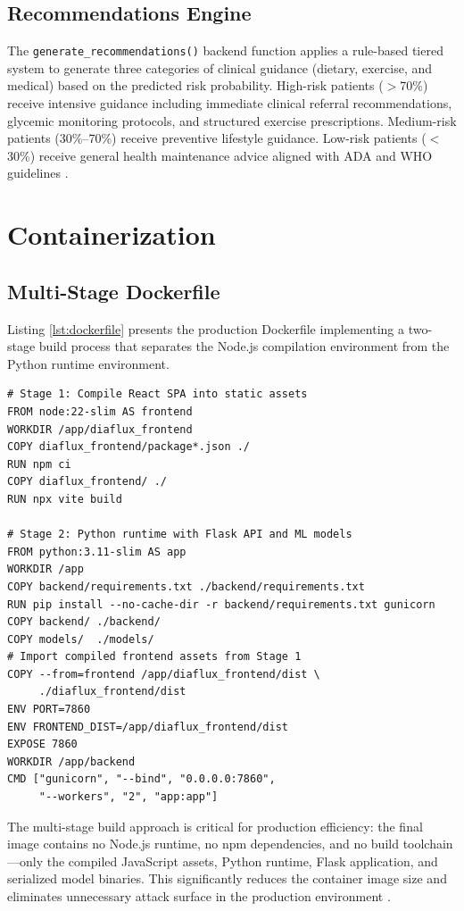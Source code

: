 \documentclass[12pt,a4paper]{report}
\begin{document}
\subsection{Recommendations Engine}
The \texttt{generate\_recommendations()} backend function applies a rule-based tiered system to generate three categories of clinical guidance (dietary, exercise, and medical) based on the predicted risk probability. High-risk patients ($>$70\%) receive intensive guidance including immediate clinical referral recommendations, glycemic monitoring protocols, and structured exercise prescriptions. Medium-risk patients (30\%--70\%) receive preventive lifestyle guidance. Low-risk patients ($<$30\%) receive general health maintenance advice aligned with ADA and WHO guidelines \cite{ada_standards_2023, who_global_report}.

\section{Containerization}

\subsection{Multi-Stage Dockerfile}
Listing \ref{lst:dockerfile} presents the production Dockerfile implementing a two-stage build process that separates the Node.js compilation environment from the Python runtime environment.

\begin{lstlisting}[language=HTML, caption=Multi-Stage Production Dockerfile, label=lst:dockerfile]
# Stage 1: Compile React SPA into static assets
FROM node:22-slim AS frontend
WORKDIR /app/diaflux_frontend
COPY diaflux_frontend/package*.json ./
RUN npm ci
COPY diaflux_frontend/ ./
RUN npx vite build

# Stage 2: Python runtime with Flask API and ML models
FROM python:3.11-slim AS app
WORKDIR /app
COPY backend/requirements.txt ./backend/requirements.txt
RUN pip install --no-cache-dir -r backend/requirements.txt gunicorn
COPY backend/ ./backend/
COPY models/  ./models/
# Import compiled frontend assets from Stage 1
COPY --from=frontend /app/diaflux_frontend/dist \
     ./diaflux_frontend/dist
ENV PORT=7860
ENV FRONTEND_DIST=/app/diaflux_frontend/dist
EXPOSE 7860
WORKDIR /app/backend
CMD ["gunicorn", "--bind", "0.0.0.0:7860",
     "--workers", "2", "app:app"]
\end{lstlisting}

The multi-stage build approach is critical for production efficiency: the final image contains no Node.js runtime, no npm dependencies, and no build toolchain---only the compiled JavaScript assets, Python runtime, Flask application, and serialized model binaries. This significantly reduces the container image size and eliminates unnecessary attack surface in the production environment \cite{docker_doc}.
\end{document}
